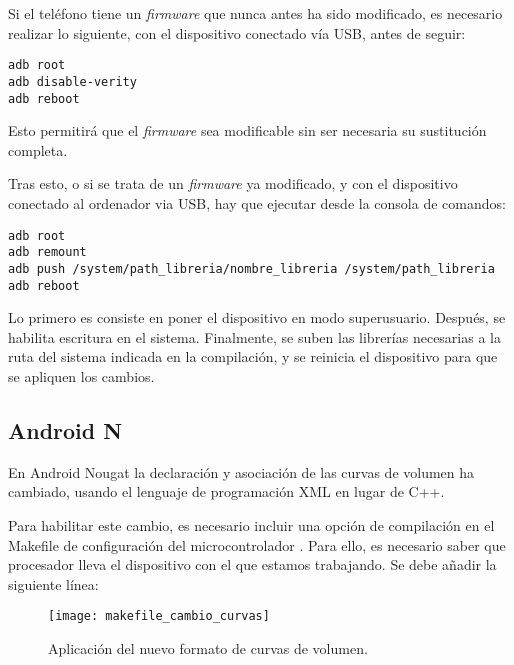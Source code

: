 Si el teléfono tiene un \textit{firmware} que nunca antes ha sido modificado, es necesario realizar lo siguiente, con el dispositivo conectado vía \gls{USB}, antes de seguir:
\\
\lstset{breaklines=true, basicstyle=\footnotesize}
\begin{lstlisting}[frame=single]
adb root
adb disable-verity
adb reboot
\end{lstlisting}

Esto permitirá que el \textit{firmware} sea modificable sin ser necesaria su sustitución completa.

Tras esto, o si se trata de un \textit{firmware} ya modificado, y con el dispositivo conectado al ordenador via \gls{USB}, hay que ejecutar desde la consola de comandos:
\\
\lstset{breaklines=true, basicstyle=\footnotesize}
\begin{lstlisting}[frame=single]
adb root
adb remount
adb push /system/path_libreria/nombre_libreria /system/path_libreria
adb reboot
\end{lstlisting}

Lo primero es consiste en poner el dispositivo en modo superusuario. Después, se habilita escritura en el sistema. Finalmente, se suben las librerías necesarias a la ruta del sistema indicada en la compilación, y se reinicia el dispositivo para que se apliquen los cambios.

\subsection{Android N}
En Android Nougat la declaración y asociación de las curvas de volumen ha cambiado, usando el lenguaje de programación XML en lugar de C++.

Para habilitar este cambio, es necesario incluir una opción de compilación en el Makefile de configuración del microcontrolador \cite{curves_android_n}. Para ello, es necesario saber que procesador lleva el dispositivo con el que estamos trabajando. Se debe añadir la siguiente línea:

\begin{figure}[H]
	\centering
	\texttt{[image: makefile\_cambio\_curvas]}
	\caption{Aplicación del nuevo formato de curvas de volumen.}
	\label{fig:mk_cambio_curvas}
\end{figure}

